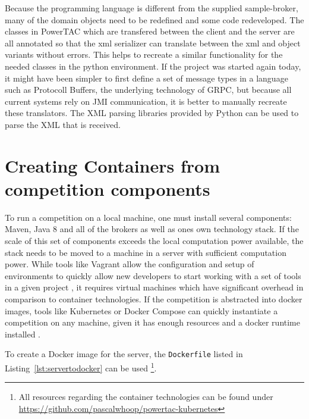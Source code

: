 Because the programming language is different from the supplied sample-broker, many of the domain objects need to be
redefined and some code redeveloped. The classes in \ac {PowerTAC} which are transfered between the client and the
server are all annotated so that the xml serializer can translate between the xml and object variants without errors.
This helps to recreate a similar functionality for the needed classes in the python environment. If the project was
started again today, it might have been simpler to first define a set of message types in a language such as Protocoll
Buffers, the underlying technology of \ac {GRPC}, but because all current systems rely on \ac {JMI} communication, it is
better to manually recreate these translators. The \ac {XML} parsing libraries provided by Python can be used to parse
the \ac {XML} that is received.


\section{Creating Containers from competition components}
\label{sec:creating_containers_from_competition_components}

To run a competition on a local machine, one must install several components: Maven, Java 8 and all of the brokers as
well as ones own technology stack. If the scale of this set of components exceeds the local computation power available,
the stack needs to be moved to a machine in a server with sufficient computation power. While tools like Vagrant allow
the configuration and setup of environments to quickly allow new developers to start working with a set of tools in a
given project \citep{vagrant} , it requires virtual machines which have significant overhead in comparison to container
technologies. If the competition is abstracted into docker images, tools like Kubernetes or Docker Compose can quickly
instantiate a competition on any machine, given it has enough resources and a docker runtime installed \citep{docker}.

To create a Docker image for the server, the \texttt{Dockerfile} listed in Listing~\ref{lst:servertodocker} can be used
\footnote{All resources regarding the container technologies can be found under
\url{https://github.com/pascalwhoop/powertac-kubernetes}}.

